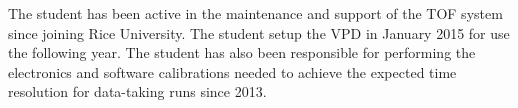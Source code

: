 The student has been active in the maintenance and support of the TOF system since joining Rice University. The student setup the VPD in January 2015 for use the following year. The student has also been responsible for performing the electronics and software calibrations needed to achieve the expected time resolution for data-taking runs since 2013.
